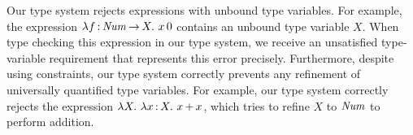 Our type system rejects expressions with unbound type variables. For example,
the expression $\lambda f \mathop{:} \mathit{Num} \mathop{\rightarrow} X.\ x\, 0$ contains an unbound type
variable $X$. When type checking this expression in our type system, we receive
an unsatisfied type-variable requirement that represents this error precisely.
Furthermore, despite using constraints, our type system correctly prevents any
refinement of universally quantified type variables. For example, our type
system correctly rejects the expression $\lambda X.\ \lambda x \mathop{:} X.\ x \mathop{+} x$,
which tries to refine $X$ to $\mathit{Num}$ to perform addition.


